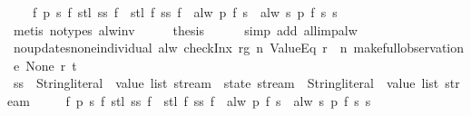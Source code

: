 \begin{isabellebody}
\ \ \ \ {\isachardoublequoteopen}{\isasymforall}f\ p\ s{\isachardot}\ f\ {\isacharparenleft}stl\ {\isacharparenleft}ss\ f{\isacharparenright}{\isacharparenright}\ {\isasymnoteq}\ stl\ {\isacharparenleft}f\ {\isacharparenleft}ss\ f{\isacharparenright}{\isacharparenright}\ {\isasymor}\ alw\ p\ {\isacharparenleft}f\ s{\isacharparenright}\ {\isacharequal}\ alw\ {\isacharparenleft}{\isasymlambda}s{\isachardot}\ p\ {\isacharparenleft}f\ s{\isacharparenright}{\isacharparenright}\ s{\isachardoublequoteclose}\isanewline
\ \ \ \ \isamarkupfalse%
\ {\isacharparenleft}metis\ {\isacharparenleft}no{\isacharunderscore}types{\isacharparenright}\ alw{\isacharunderscore}inv{\isacharparenright}\isanewline
\ \ \isamarkupfalse%
\ \isamarkupfalse%
\ {\isacharquery}thesis\isanewline
\ \ \ \ \isamarkupfalse%
\ {\isacharparenleft}simp\ add{\isacharcolon}\ all{\isacharunderscore}imp{\isacharunderscore}alw{\isacharparenright}\isanewline
{}\isamarkupfalse%
%
\endisatagproof
{\isafoldproof}%
%
\isadelimproof
\isanewline
%
\endisadelimproof
\isanewline
{}\isamarkupfalse%
\ no{\isacharunderscore}updates{\isacharunderscore}none{\isacharunderscore}individual{\isacharcolon}\ {\isachardoublequoteopen}alw\ {\isacharparenleft}checkInx\ rg\ n\ ValueEq\ {\isacharparenleft}r\ {\isachardollar}\ n{\isacharparenright}{\isacharparenright}\ {\isacharparenleft}make{\isacharunderscore}full{\isacharunderscore}observation\ e\ None\ r\ t{\isacharparenright}{\isachardoublequoteclose}\isanewline
%
\isadelimproof
%
\endisadelimproof
%
\isatagproof
{}\isamarkupfalse%
\ {\isacharminus}\isanewline
\ \ \isamarkupfalse%
\ ss\ {\isacharcolon}{\isacharcolon}\ {\isachardoublequoteopen}{\isacharparenleft}{\isacharparenleft}String{\isachardot}literal\ {\isasymtimes}\ value\ list{\isacharparenright}\ stream\ {\isasymRightarrow}\ state\ stream{\isacharparenright}\ {\isasymRightarrow}\ {\isacharparenleft}String{\isachardot}literal\ {\isasymtimes}\ value\ list{\isacharparenright}\ stream{\isachardoublequoteclose}\ \isanewline
\ \ \ \ {\isachardoublequoteopen}{\isasymforall}f\ p\ s{\isachardot}\ f\ {\isacharparenleft}stl\ {\isacharparenleft}ss\ f{\isacharparenright}{\isacharparenright}\ {\isasymnoteq}\ stl\ {\isacharparenleft}f\ {\isacharparenleft}ss\ f{\isacharparenright}{\isacharparenright}\ {\isasymor}\ alw\ p\ {\isacharparenleft}f\ s{\isacharparenright}\ {\isacharequal}\ alw\ {\isacharparenleft}{\isasymlambda}s{\isachardot}\ p\ {\isacharparenleft}f\ s{\isacharparenright}{\isacharparenright}\ s{\isachardoublequoteclose}\isanewline

\end{isabellebody}
